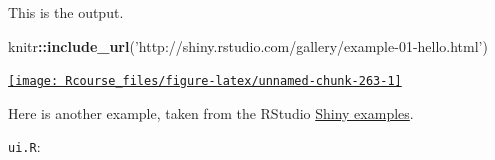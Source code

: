 \documentclass[]{book}
\newenvironment{Shaded}{\begin{snugshade}}{\end{snugshade}}
\newcommand{\KeywordTok}[1]{\textcolor[rgb]{0.13,0.29,0.53}{\textbf{#1}}}
\newcommand{\StringTok}[1]{\textcolor[rgb]{0.31,0.60,0.02}{#1}}
\newcommand{\OperatorTok}[1]{\textcolor[rgb]{0.81,0.36,0.00}{\textbf{#1}}}
\newcommand{\NormalTok}[1]{#1}
\theoremstyle{definition}
\theoremstyle{definition}
\theoremstyle{definition}
\theoremstyle{remark}
\begin{document}
This is the output.

\begin{Shaded}
\begin{Highlighting}[]
\NormalTok{knitr}\OperatorTok{::}\KeywordTok{include_url}\NormalTok{(}\StringTok{'http://shiny.rstudio.com/gallery/example-01-hello.html'}\NormalTok{)}
\end{Highlighting}
\end{Shaded}

\href{http://shiny.rstudio.com/gallery/example-01-hello.html}{\texttt{[image: Rcourse\_files/figure-latex/unnamed-chunk-263-1]} }

Here is another example, taken from the RStudio
\href{https://github.com/rstudio/shiny-examples/tree/master/006-tabsets}{Shiny
examples}.

\texttt{ui.R}:
\end{document}
